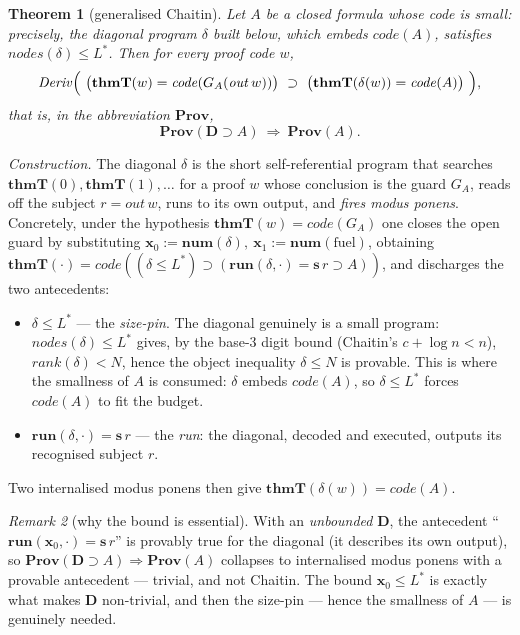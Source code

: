 \documentclass[11pt]{article}
\theoremstyle{plain}
\newtheorem{theorem}{Theorem}[section]
\theoremstyle{definition}
\theoremstyle{remark}
\newtheorem{remark}[theorem]{Remark}
\newcommand{\code}[1]{\mathit{code}(#1)}
\newcommand{\thmT}{\mathbf{thmT}}
\newcommand{\num}{\mathbf{num}}
\newcommand{\runp}{\mathbf{run}}
\newcommand{\Prov}{\mathbf{Prov}}
\newcommand{\Deriv}{\mathit{Deriv}}
\newcommand{\Lstar}{L^{*}}
\newcommand{\describe}{\mathbf{D}}
\begin{document}
\begin{theorem}[generalised Chaitin]\label{thm:genchaitin}
Let $A$ be a closed formula whose code is \emph{small}: precisely, the diagonal
program $\delta$ built below, which embeds $\code{A}$, satisfies
$\mathit{nodes}(\delta)\le\Lstar$. Then for every proof code $w$,
\[
  \Deriv\Bigl(\ \bigl(\thmT(w)=\code{G_A(\mathit{out}\,w)}\bigr)
              \ \supset\ \bigl(\thmT(\delta(w))=\code{A}\bigr)\ \Bigr),
\]
that is, in the abbreviation $\Prov$,
\[
  \Prov(\describe\supset A)\ \Longrightarrow\ \Prov(A).
\]
\end{theorem}

\noindent\emph{Construction.} The diagonal $\delta$ is the short self-referential
program that searches $\thmT(0),\thmT(1),\dots$ for a proof $w$ whose conclusion
is the guard $G_A$, reads off the subject $r=\mathit{out}\,w$, runs to its own
output, and \emph{fires modus ponens}. Concretely, under the hypothesis
$\thmT(w)=\code{G_A}$ one closes the open guard by substituting
$\mathbf{x}_0:=\num(\delta),\ \mathbf{x}_1:=\num(\text{fuel})$, obtaining
$\thmT(\cdot)=\code{(\delta\le\Lstar)\supset(\runp(\delta,\cdot)=\mathbf{s}\,r\supset A)}$,
and discharges the two antecedents:
\begin{itemize}
  \item $\delta\le\Lstar$ --- the \emph{size-pin}. The diagonal genuinely is a
        small program: $\mathit{nodes}(\delta)\le\Lstar$ gives, by the base-$3$
        digit bound (Chaitin's $c+\log n<n$), $\mathit{rank}(\delta)<N$, hence
        the object inequality $\delta\le N$ is provable. This is where the
        smallness of $A$ is consumed: $\delta$ embeds $\code A$, so $\delta\le\Lstar$
        forces $\code A$ to fit the budget.
  \item $\runp(\delta,\cdot)=\mathbf{s}\,r$ --- the \emph{run}: the diagonal,
        decoded and executed, outputs its recognised subject $r$.
\end{itemize}
Two internalised modus ponens then give $\thmT(\delta(w))=\code{A}$.

\begin{remark}[why the bound is essential]
With an \emph{unbounded} $\describe$, the antecedent ``$\runp(\mathbf{x}_0,\cdot)=\mathbf{s}\,r$''
is provably true for the diagonal (it describes its own output), so
$\Prov(\describe\supset A)\Rightarrow\Prov(A)$ collapses to internalised modus
ponens with a provable antecedent --- trivial, and not Chaitin. The bound
$\mathbf{x}_0\le\Lstar$ is exactly what makes $\describe$ non-trivial, and then
the size-pin --- hence the smallness of $A$ --- is genuinely needed.
\end{remark}
\end{document}
